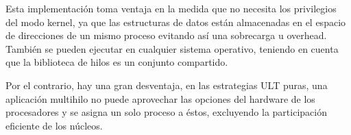 \documentclass[12pt, letter]{article}
\begin{document}
\setlength{\parindent}{31pt}
Esta implementación toma ventaja en la medida que no necesita los privilegios del modo kernel, ya que las estructuras de datos están almacenadas en el espacio de direcciones de un mismo proceso evitando así una sobrecarga u overhead. También se pueden ejecutar en cualquier sistema operativo, teniendo en cuenta que la biblioteca de hilos es un conjunto compartido.

\setlength{\parindent}{31pt}
Por el contrario, hay una gran desventaja, en las estrategias ULT puras, una aplicación multihilo no puede aprovechar las opciones del hardware de los procesadores y se asigna un solo proceso a éstos, excluyendo la participación eficiente de los núcleos.
\end{document}
